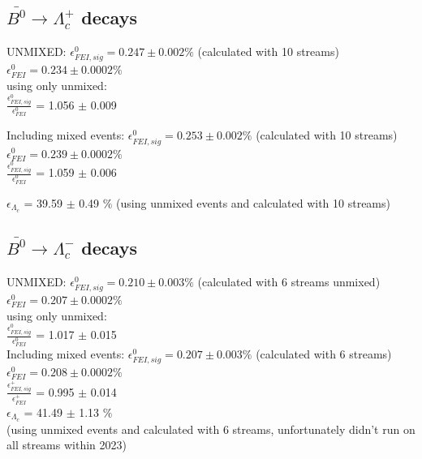 \subsection{$\bar{B^0} \rightarrow \Lambda_c^+$  decays}
UNMIXED:
$\epsilon^0_{FEI,sig} = 0.247 \pm 0.002\%$ (calculated with  10 streams)\\
$\epsilon^0_{FEI} = 0.234 \pm 0.0002\%$ \\

using only unmixed:\\
$\frac{\epsilon^0_{FEI,sig}}{\epsilon^0_{FEI}}$ = 1.056 $\pm$ 0.009%

Including mixed events:
$\epsilon^0_{FEI,sig} = 0.253 \pm 0.002\%$ (calculated with  10 streams)\\
$\epsilon^0_{FEI} = 0.239 \pm 0.0002\%$ \\
$\frac{\epsilon^0_{FEI,sig}}{\epsilon^0_{FEI}}$ = 1.059 $\pm$ 0.006

$\epsilon_{\Lambda_c}$ = 39.59 $\pm $ 0.49 $\%$ %
 (using unmixed events and calculated with  10 streams)

\subsection{$\bar{B^0} \rightarrow \Lambda_c^-$  decays}
UNMIXED:
$\epsilon^0_{FEI,sig} = 0.210 \pm 0.003\%$ (calculated with  6 streams unmixed)\\
$\epsilon^0_{FEI} = 0.207 \pm 0.0002\%$ \\
using only unmixed:\\
$\frac{\epsilon^0_{FEI,sig}}{\epsilon^0_{FEI}}$ = 1.017 $\pm$ 0.015\\

Including mixed events:
$\epsilon^0_{FEI,sig} = 0.207 \pm 0.003\%$ (calculated with 6 streams)\\
$\epsilon^0_{FEI} = 0.208 \pm 0.0002\%$ \\
$\frac{\epsilon^+_{FEI,sig}}{\epsilon^+_{FEI}}$ = 0.995 $\pm$ 0.014\\%

$\epsilon_{\Lambda_c}$ = 41.49  $\pm $ 1.13 $\%$\\ %
(using unmixed events and calculated with  6 streams, unfortunately didn't run on all streams within 2023)